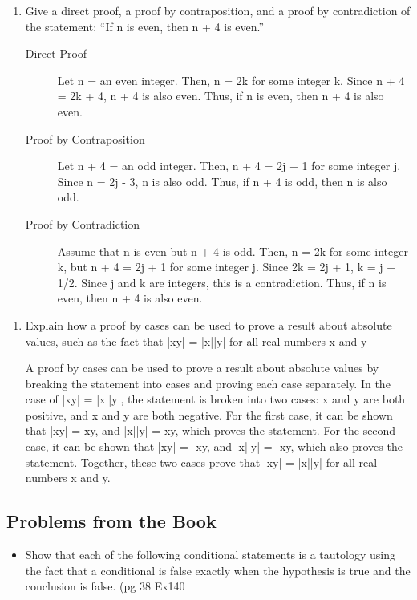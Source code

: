\documentclass[11pt]{article}
\begin{document}
\begin{enumerate}
\item Give a direct proof, a proof by contraposition, and a proof by contradiction of the statement: “If n is even, then n + 4 is even.”
\begin{description}
\item[{Direct Proof}] Let n = an even integer. Then, n = 2k for some integer k. Since n + 4 = 2k + 4, n + 4 is also even. Thus, if n is even, then n + 4 is also even.
\item[{Proof by Contraposition}] Let n + 4 = an odd integer. Then, n + 4 = 2j + 1 for some integer j. Since n = 2j - 3, n is also odd. Thus, if n + 4 is odd, then n is also odd.
\item[{Proof by Contradiction}] Assume that n is even but n + 4 is odd. Then, n = 2k for some integer k, but n + 4 = 2j + 1 for some integer j. Since 2k = 2j + 1, k = j + 1/2. Since j and k are integers, this is a contradiction. Thus, if n is even, then n + 4 is also even.
\end{description}
\end{enumerate}


\begin{enumerate}
\item Explain how a proof by cases can be used to prove a result about absolute values, such as the fact that |xy| = |x||y| for all real numbers x and y

A proof by cases can be used to prove a result about absolute values by breaking the statement into cases and proving each case separately. In the case of |xy| = |x||y|, the statement is broken into two cases: x and y are both positive, and x and y are both negative. For the first case, it can be shown that |xy| = xy, and |x||y| = xy, which proves the statement. For the second case, it can be shown that |xy| = -xy, and |x||y| = -xy, which also proves the statement. Together, these two cases prove that |xy| = |x||y| for all real numbers x and y.
\end{enumerate}
\subsection{Problems from the Book}
\label{sec:orgdcff64b}
\begin{itemize}
\item Show that each of the following conditional statements is a tautology using the fact that a conditional is false exactly when the hypothesis is true and the conclusion is false. (pg 38 Ex140
\end{itemize}
\end{document}
